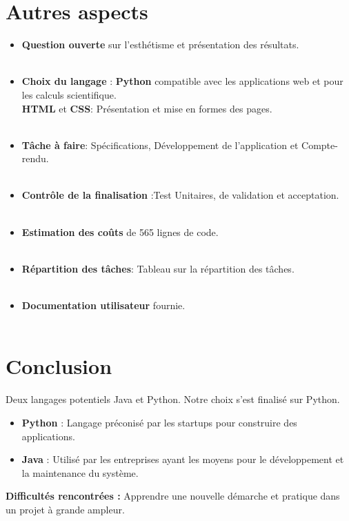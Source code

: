 	\section{Autres aspects}
	\begin{frame}
		\begin{itemize}
		\item \textbf{Question ouverte} sur l'esthétisme et présentation des résultats.\\~\\
		\pause
		\item \textbf{Choix du langage} : \textbf{Python} compatible avec les applications web et pour les calculs scientifique. \\
		\textbf{HTML} et \textbf{CSS}: Présentation et mise en formes des pages.\\~\\
		\pause
		\item \textbf{Tâche à faire}: Spécifications, Développement de l'application et Compte-rendu.\\~\\
		\pause
		\item \textbf{Contrôle de la finalisation} :Test Unitaires, de validation et acceptation.\\~\\
		\pause
		\item \textbf{Estimation des coûts} de 565 lignes de code.\\~\\
		\pause
		\item \textbf{Répartition des tâches}: Tableau sur la répartition des tâches.\\~\\
		\pause
		\item \textbf{Documentation utilisateur} fournie.\\~\\
		
		
		\end{itemize}
	\end{frame}
	
	\section{Conclusion}
	\begin{frame}
		Deux langages potentiels Java et Python. Notre choix s'est finalisé sur Python.
		\begin{itemize}
		\pause
		\item \textbf{Python} : Langage préconisé par les startups pour construire des applications. 
		\pause
		\item \textbf{Java} : Utilisé par les entreprises ayant les moyens pour le développement et la maintenance du système.
		\end{itemize}
		\pause
		\textbf{Difficultés rencontrées :}  Apprendre une nouvelle démarche et pratique dans un projet à grande ampleur.\\
	\end{frame}	
	
